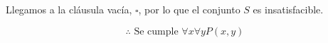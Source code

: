 \documentclass[12pt,letterpaper]{article}
\begin{document}
\begin{enumerate}
  Llegamos a la cl\'{a}usula vac\'{i}a, $\square$, por lo que el conjunto $S$ es insatisfacible.

  \[
  \therefore \text{ Se cumple } \forall \text{$x$} \forall \text{$y$} \text{$P(x,y)$}
  \]
  
\end{enumerate}
\end{document}
